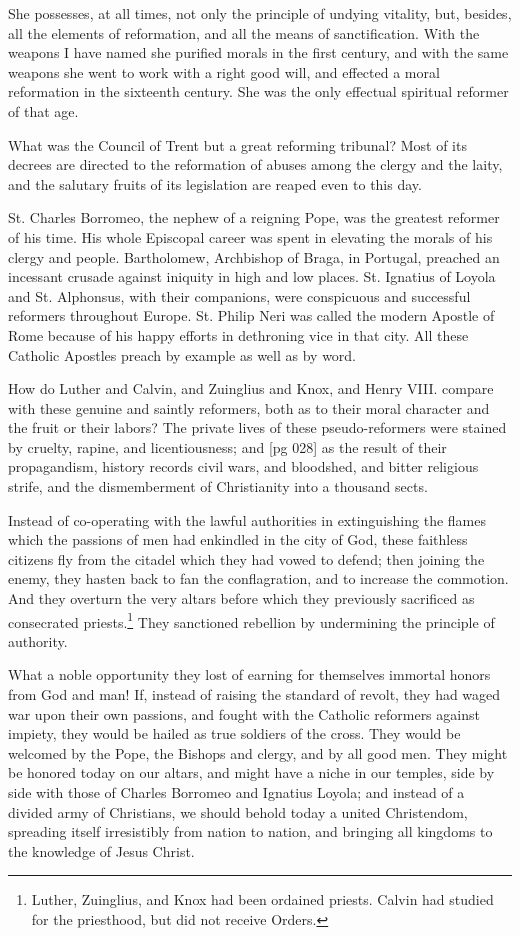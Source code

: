 She possesses, at all times, not only the principle
of undying vitality, but, besides, all the elements
of reformation, and all the means of sanctification.
With the weapons I have named she purified
morals in the first century, and with the same
weapons she went to work with a right good will,
and effected a moral reformation in the sixteenth
century. She was the only effectual spiritual reformer
of that age.

What was the Council of Trent but a great reforming
tribunal? Most of its decrees are directed
to the reformation of abuses among the clergy and
the laity, and the salutary fruits of its legislation
are reaped even to this day.

St. Charles Borromeo, the nephew of a reigning
Pope, was the greatest reformer of his time. His
whole Episcopal career was spent in elevating the
morals of his clergy and people. Bartholomew,
Archbishop of Braga, in Portugal, preached an
incessant crusade against iniquity in high and low
places. St. Ignatius of Loyola and St. Alphonsus,
with their companions, were conspicuous and successful
reformers throughout Europe. St. Philip
Neri was called the modern Apostle of Rome because
of his happy efforts in dethroning vice in
that city. All these Catholic Apostles preach by
example as well as by word.

How do Luther and Calvin, and Zuinglius and
Knox, and Henry VIII. compare with these
genuine and saintly reformers, both as to their
moral character and the fruit or their labors?
The private lives of these pseudo-reformers were
stained by cruelty, rapine, and licentiousness; and
[pg 028]
as the result of their propagandism, history
records civil wars, and bloodshed, and bitter religious
strife, and the dismemberment of Christianity
into a thousand sects.

Instead of co-operating with the lawful authorities
in extinguishing the flames which the passions
of men had enkindled in the city of God, these
faithless citizens fly from the citadel which they
had vowed to defend; then joining the enemy, they
hasten back to fan the conflagration, and to increase
the commotion. And they overturn the
very altars before which they previously sacrificed
as consecrated priests.\footnote{Luther, Zuinglius,
and Knox had been ordained priests.
Calvin had studied for the priesthood, but did not receive
Orders.} They sanctioned rebellion
by undermining the principle of authority.

What a noble opportunity they lost of earning
for themselves immortal honors from God and
man! If, instead of raising the standard of revolt,
they had waged war upon their own passions,
and fought with the Catholic reformers against
impiety, they would be hailed as true soldiers of
the cross. They would be welcomed by the Pope,
the Bishops and clergy, and by all good men. They
might be honored today on our altars, and might
have a niche in our temples, side by side with
those of Charles Borromeo and Ignatius Loyola;
and instead of a divided army of Christians, we
should behold today a united Christendom, spreading
itself irresistibly from nation to nation, and
bringing all kingdoms to the knowledge of Jesus
Christ.

